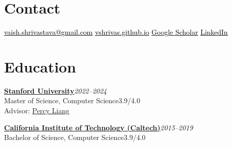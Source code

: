 \documentclass[margin,line]{templates/resume}
\renewcommand{\dates}[1]{\hfill\mbox{\small\itshape #1}}
\newcommand{\contactlink}[2]{\href{#1}{\textcolor{contactunderline}{\uline{\textcolor{black}{#2}}}}}
\begin{document}
\begin{resume}

\section{Contact}
\contactlink{mailto:vaish.shrivastava@gmail.com}{vaish.shrivastava@gmail.com} \textperiodcentered{} \contactlink{https://vshrivas.github.io/}{vshrivas.github.io} \textperiodcentered{} \contactlink{https://scholar.google.com/citations?user=N0nX2VsAAAAJ&hl=en}{Google Scholar} \textperiodcentered{} \contactlink{https://www.linkedin.com/in/vaish-shrivastava/}{LinkedIn}

\section{Education}
\textbf{\href{https://cs.stanford.edu/}{Stanford University}}\dates{2022--2024}\\
\hspace*{10pt}Master of Science, Computer Science\hfill 3.9/4.0\\
\hspace*{10pt}Advisor: \href{https://cs.stanford.edu/~pliang/}{Percy Liang}

\vspace{3pt}
\textbf{\href{https://www.cms.caltech.edu/}{California Institute of Technology (Caltech)}}\dates{2015--2019}\\
\hspace*{10pt}Bachelor of Science, Computer Science\hfill 3.9/4.0


\end{resume}
\end{document}

